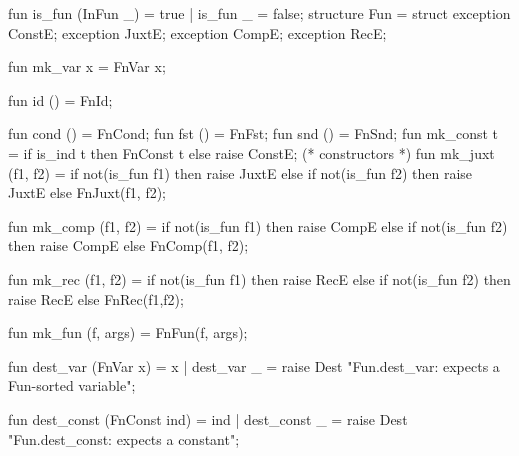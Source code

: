 fun is_fun (InFun _) = true
  | is_fun _ = false;
\eatline
{}\nwendcode{}\nwdocspar
\nwenddocs{}\endmoddef\nwstartdeflinemarkup{}\nwenddeflinemarkup
structure Fun = struct
exception ConstE;
exception JuxtE;
exception CompE;
exception RecE;

fun mk_var x = FnVar x;

fun id () = FnId;

fun cond () = FnCond;
fun fst () = FnFst;
fun snd () = FnSnd;
fun mk_const t = if is_ind t then FnConst t
                 else raise ConstE; 
(* constructors *)
fun mk_juxt (f1, f2) =
  if not(is_fun f1) then raise JuxtE
  else if not(is_fun f2) then raise JuxtE
  else FnJuxt(f1, f2);

fun mk_comp (f1, f2) =
  if not(is_fun f1) then raise CompE
  else if not(is_fun f2) then raise CompE
  else FnComp(f1, f2);

fun mk_rec (f1, f2) =
  if not(is_fun f1) then raise RecE
  else if not(is_fun f2) then raise RecE
  else FnRec(f1,f2);

fun mk_fun (f, args) = FnFun(f, args);

fun dest_var (FnVar x) = x
  | dest_var _ = raise Dest "Fun.dest_var: expects a Fun-sorted variable";

fun dest_const (FnConst ind) = ind
  | dest_const _ = raise Dest "Fun.dest_const: expects a constant";

